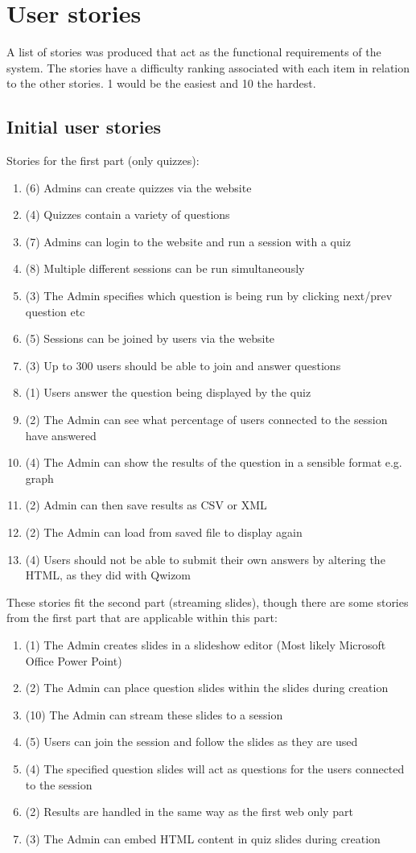 \chapter{User stories}
A list of stories was produced that act as the functional requirements of the system. The stories have a difficulty ranking associated with each item in relation to the other stories. 1 would be the easiest and 10 the hardest.

\section{Initial user stories}
\label{appendix:initial-stories}
Stories for the first part (only quizzes):
\begin{enumerate}
	\item (6) Admins can create quizzes via the website
	\item (4) Quizzes contain a variety of questions
	\item (7) Admins can login to the website and run a session with a quiz
	\item (8) Multiple different sessions can be run simultaneously
	\item (3) The Admin specifies which question is being run by clicking next/prev question etc
	\item (5) Sessions can be joined by users via the website
	\item (3) Up to 300 users should be able to join and answer questions
	\item (1) Users answer the question being displayed by the quiz
	\item (2) The Admin can see what percentage of users connected to the session have answered
	\item (4) The Admin can show the results of the question in a sensible format e.g. graph
	\item (2) Admin can then save results as CSV or XML
	\item (2) The Admin can load from saved file to display again
	\item (4) Users should not be able to submit their own answers by altering the HTML, as they did with Qwizom
\end{enumerate}
These stories fit the second part (streaming slides), though there are some stories from the first part that are applicable within this part:
\begin{enumerate}
	\item (1) The Admin creates slides in a slideshow editor (Most likely Microsoft Office Power Point)
	\item (2) The Admin can place question slides within the slides during creation
	\item (10) The Admin can stream these slides to a session
	\item (5) Users can join the session and follow the slides as they are used	
	\item (4) The specified question slides will act as questions for the users connected to the session
	\item (2) Results are handled in the same way as the first web only part
	\item (3) The Admin can embed HTML content in quiz slides during creation
\end{enumerate}

